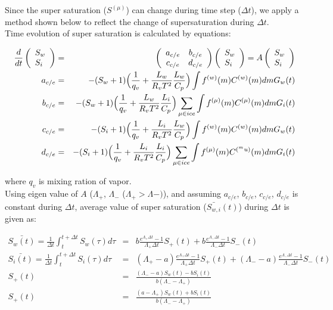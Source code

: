 Since the super saturation ($S^{(\mu)}$) can change during time step ($\Delta t$), we apply a method shown below to reflect the change of supersaturation during $\Delta t$.\\
Time evolution of super saturation is calculated by equations: 

\begin{eqnarray}
\frac{d}{dt}\left(
\begin{array}{l}
S_{w}\\
S_{i}\\
\end{array}\right )
&=&
\left(
\begin{array}{cc}
a_{c/e}& b_{c/e}\\
c_{c/e}& d_{c/e}
\end{array}\right)
\left(
\begin{array}{l}
S_{w}\\
S_{i}
\end{array}\right)
=
A
\left(
\begin{array}{l}
S_{w}\\
S_{i}
\end{array}\right)\\
a_{c/e}&=&-(S_{w}+1)\Bigl(\frac{1}{q_{v}}+\frac{L_{w}}{R_{v}T^{2}}\frac{L_{w}}{C_{p}}\Bigr )\int f^{(w)}(m)C^{(w)}(m)dm G_{w}(t)\nonumber\\
b_{c/e}&=&-(S_{w}+1)\Bigl(\frac{1}{q_{v}}+\frac{L_{w}}{R_{v}T^{2}}\frac{L_{i}}{C_{p}}\Bigr ) \sum_{\mu \in ice}\int f^{(\mu)}(m)C^{(\mu)}(m)dm G_{i}(t)\nonumber\\
c_{c/e}&=&-(S_{i}+1)\Bigl(\frac{1}{q_{v}}+\frac{L_{i}}{R_{v}T^{2}}\frac{L_{w}}{C_{p}}\Bigr ) \int f^{(w)}(m)C^{(w)}(m)dm G_{w}(t)\nonumber\\
d_{c/e}&=&-(S_{i}+1)\Bigl(\frac{1}{q_{v}}+\frac{L_{i}}{R_{v}T^{2}}\frac{L_{i}}{C_{p}}\Bigr ) \sum_{\mu \in ice}\int f^{(\mu)}(m)C^{(^mu)}(m)dm G_{i}(t)\nonumber
\end{eqnarray}


where $q_{v}$ is mixing ration of vapor. \\
Using eigen value of $A$ ($\Lambda_{+}$, $\Lambda_{-}$ ($\Lambda_{+}>\Lambda{-})$), and assuming $a_{c/e}$, $b_{c/e}$, $c_{c/e}$, $d_{c/e}$ is constant during $\Delta t$, average value of super saturation ($\bar{S_{w,i}}(t)$) during $\Delta t$ is given as:

\begin{eqnarray}
\bar{S_{w}(t)}=\frac{1}{\Delta t}\int_{t}^{t+\Delta t}S_{w}(\tau)d\tau&=&b\frac{e^{\Lambda_{+}\Delta t}-1}{\Lambda_{+}\Delta t}S_{+}(t)+b\frac{e^{\Lambda_{-}\Delta t}-1}{\Lambda_{-}\Delta t}S_{-}(t)\nonumber\\
\bar{S_{i}(t)}=\frac{1}{\Delta t}\int_{t}^{t+\Delta t}S_{i}(\tau)d\tau&=&(\Lambda_{+}-a)\frac{e^{\Lambda_{+}\Delta t}-1}{\Lambda_{+}\Delta t}S_{+}(t)+(\Lambda_{-}-a)\frac{e^{\Lambda_{-}\Delta t}-1}{\Lambda_{-}\Delta t}S_{-}(t)\nonumber\\
S_{+}(t)&=&\frac{(\Lambda_{-}-a)S_{w}(t)-bS_{i}(t)}{b(\Lambda_{-}-\Lambda_{+})}\nonumber\\
S_{+}(t)&=&\frac{(a-\Lambda_{+})S_{w}(t)+bS_{i}(t)}{b(\Lambda_{-}-\Lambda_{+})}\nonumber
\end{eqnarray}


